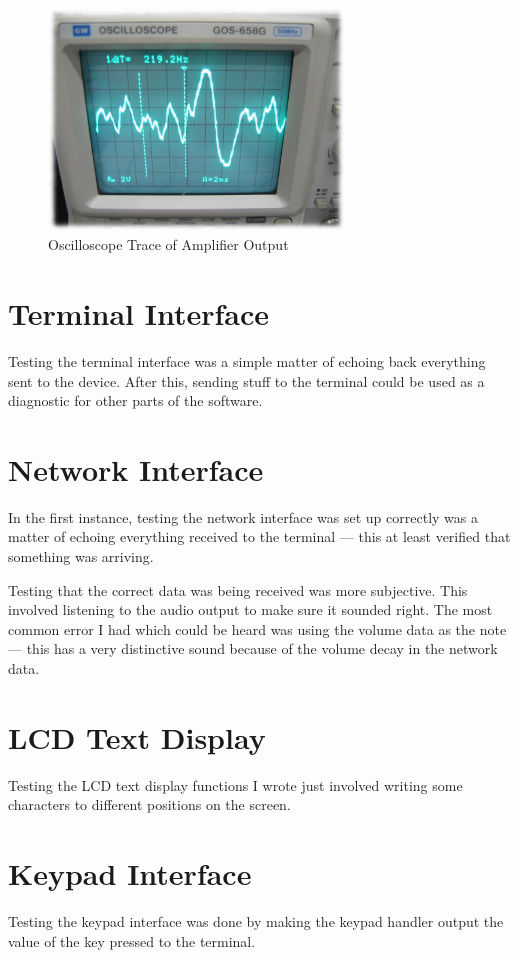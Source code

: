\begin{figure}[htb]
\centering
\includegraphics[width=0.7\textwidth]{images/oscilloscope}
\caption{Oscilloscope Trace of Amplifier Output}\label{fig:oscilloscope}
\end{figure}

\section{Terminal Interface}

Testing the terminal interface was a simple matter of echoing back everything sent to the device.  
After this, sending stuff to the terminal could be used as a diagnostic for other parts of the 
software.

\section{Network Interface}

In the first instance, testing the network interface was set up correctly was a matter of echoing 
everything received to the terminal --- this at least verified that something was arriving.

Testing that the correct data was being received was more subjective.  This involved listening to 
the audio output to make sure it sounded right.  The most common error I had which could be heard 
was using the volume data as the note --- this has a very distinctive sound because of the volume 
decay in the network data.

\section{LCD Text Display}

Testing the LCD text display functions I wrote just involved writing some characters to different 
positions on the screen.

\section{Keypad Interface}

Testing the keypad interface was done by making the keypad handler output the value of the key 
pressed to the terminal.
